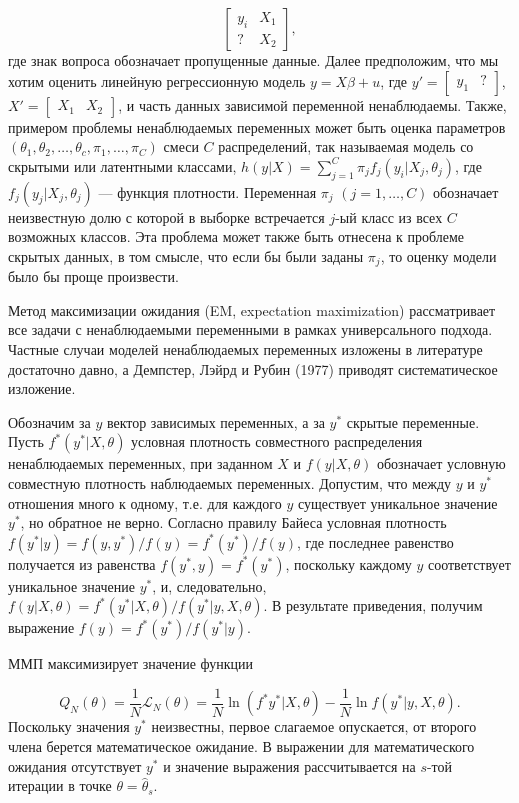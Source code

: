 \[
\begin{bmatrix} y_{i}&X_{1} \\ ?&X_{2} \end{bmatrix},
\]
где знак вопроса обозначает пропущенные данные. Далее предположим, что мы хотим оценить линейную регрессионную модель $y=X\beta+u$, где $y'= \begin{bmatrix} y_1 & ? \end{bmatrix}$, $X'= \begin{bmatrix} X_1 & X_2 \end{bmatrix}$, и часть данных зависимой переменной ненаблюдаемы. Также, примером проблемы ненаблюдаемых переменных может быть оценка параметров $(\theta_1,\theta_2,\ldots ,\theta_c,\pi_1,\ldots ,\pi_C)$ смеси $C$ распределений, так называемая модель со скрытыми или латентными классами, $h(y|X)=\sum_{j=1}^{C}\pi_{j}f_{j}(y_i|X_{j},\theta_j)$, где $f_{j}(y_{j}|X_{j},\theta_{j})$ --- функция плотности. Переменная $\pi_{j}$ $(j=1,\ldots ,C)$ обозначает неизвестную долю с которой в выборке встречается $j$-ый класс из всех $C$ возможных классов. Эта проблема может также быть отнесена к проблеме скрытых данных, в том смысле, что если бы были заданы $\pi_{j}$, то оценку модели было бы проще произвести.

Метод максимизации ожидания (EM, expectation maximization) рассматривает все задачи с ненаблюдаемыми переменными в рамках универсального подхода. Частные случаи моделей ненаблюдаемых переменных изложены в литературе достаточно давно, а Демпстер, Лэйрд и Рубин (1977) приводят систематическое изложение.

Обозначим за $y$ вектор зависимых переменных, а за $y^{*}$ скрытые переменные. Пусть $f^{*}(y^{*}|X,\theta)$ условная плотность совместного распределения ненаблюдаемых переменных, при  заданном $X$ и $f(y|X,\theta)$ обозначает условную совместную плотность наблюдаемых переменных. Допустим, что между $y$ и $y^{*}$ отношения много к одному, т.е. для каждого $y$ существует уникальное значение $y^{*}$, но обратное не верно. Согласно правилу Байеса условная плотность $f(y^{*}|y)=f(y, y^{*})/f(y)=f^{*}(y^{*})/f(y)$, где последнее равенство получается из равенства $f(y^{*},y)=f^{*}(y^{*})$, поскольку каждому $y$ соответствует уникальное значение $y^{*}$, и, следовательно, $f(y|X,\theta)=f^{*}(y^{*}|X,\theta)/f(y^{*}|y,X,\theta)$. В результате приведения, получим выражение $f(y)=f^{*}(y^{*})/f(y^{*}|y)$.

ММП максимизирует значение функции

\begin{equation}
Q_{N}(\theta)=\dfrac{1}{N}\mathcal{L}_{N}(\theta)=\dfrac{1}{N} \ln (f^{*}y^{*}|X,\theta)-\dfrac{1}{N} \ln f(y^{*}|y,X,\theta).
\end{equation}
Поскольку значения $y^{*}$ неизвестны, первое слагаемое опускается, от второго члена берется математическое ожидание. В выражении для математического ожидания отсутствует $y^{*}$ и значение выражения рассчитывается на $s$-той итерации в точке $\theta=\hat{\theta}_s$.

